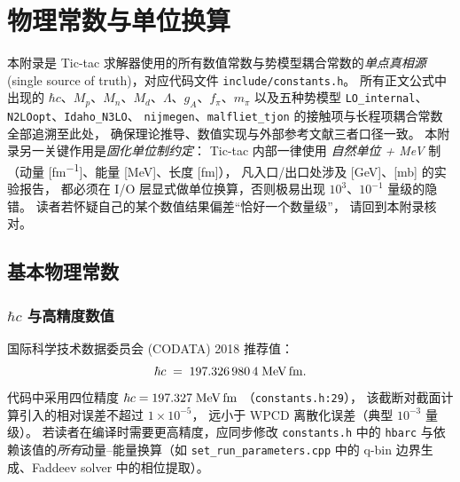 
\chapter{物理常数与单位换算}
\label{app:A_constants}

\noindent
本附录是 Tic-tac 求解器使用的所有数值常数与势模型耦合常数的\emph{单点真相源}
(single source of truth)，对应代码文件 \texttt{include/constants.h}。
所有正文公式中出现的 $\hbar c$、$M_p$、$M_n$、$M_d$、$\Lambda$、$g_A$、$f_\pi$、$m_\pi$
以及五种势模型 \texttt{LO\_internal}、\texttt{N2LOopt}、\texttt{Idaho\_N3LO}、
\texttt{nijmegen}、\texttt{malfliet\_tjon} 的接触项与长程项耦合常数全部追溯至此处，
确保理论推导、数值实现与外部参考文献三者口径一致。
本附录另一关键作用是\emph{固化单位制约定}：
Tic-tac 内部一律使用 \emph{自然单位 + MeV} 制
（动量 [\si{fm^{-1}}]、能量 [\si{MeV}]、长度 [\si{fm}]），
凡入口/出口处涉及 [\si{GeV}]、[\si{mb}] 的实验报告，
都必须在 I/O 层显式做单位换算，否则极易出现 $10^{3}$、$10^{-1}$ 量级的隐错。
读者若怀疑自己的某个数值结果偏差“恰好一个数量级”，
请回到本附录核对。

\section{基本物理常数}
\label{sec:appA_basic_constants}

\subsection{\texorpdfstring{$\hbar c$}{hbar c} 与高精度数值}

国际科学技术数据委员会 (CODATA) 2018 推荐值：
\begin{equation}
\hbarc \;=\; 197.326\,980\,4 \;\si{MeV.fm}.
\label{eq:appA_hbarc_codata}
\end{equation}
代码中采用四位精度 $\hbarc = 197.327\;\si{MeV.fm}$
（\texttt{constants.h:29}），
该截断对截面计算引入的相对误差不超过 $1\times 10^{-5}$，
远小于 WPCD 离散化误差（典型 $10^{-3}$ 量级）。
若读者在编译时需要更高精度，应同步修改 \texttt{constants.h} 中的
\texttt{hbarc} 与依赖该值的\emph{所有}动量–能量换算（如 \texttt{set\_run\_parameters.cpp}
中的 q-bin 边界生成、Faddeev solver 中的相位提取）。


